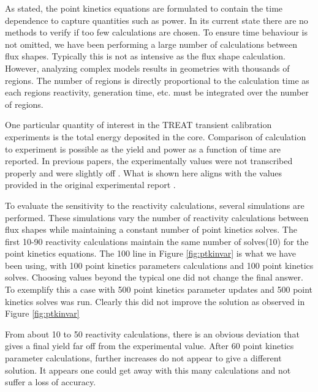 \documentclass{anstrans}
\begin{document}
As stated, the point kinetics equations are formulated to contain the time dependence to capture quantities such as power.  In its current state there are no methods to verify if too few calculations are chosen. To ensure time  behaviour is not omitted, we have been performing a large number of calculations between flux shapes.  Typically this is not as intensive as the flux shape calculation.  However, analyzing complex models results in geometries with thousands of regions. The number of regions is directly proportional to the calculation time as each regions reactivity, generation time, etc. must be integrated over the number of regions.  

One particular quantity of interest in the TREAT transient calibration experiments is the total energy deposited in the core.  Comparison of calculation to experiment is possible as the yield and power as a function of time are reported.  In previous  papers, the experimentally values were not transcribed properly and were slightly off \cite{physor_mausolff , physor_paluch}.  What is shown here aligns with the values provided in the original experimental report \cite{Robinson_Bauer_1994}. 
   
   To evaluate the sensitivity to the reactivity calculations, several simulations are performed.  These simulations vary the number of reactivity calculations between flux shapes while maintaining a constant number of point kinetics solves.  The first 10-90 reactivity calculations maintain the same number of solves(10) for the point kinetics equations.  The 100 line in Figure \ref{fig:ptkinvar} is what we have been using, with 100 point kinetics parameters calculations and 100 point kinetics solves. Choosing values beyond the typical one did not change the final answer.  To exemplify this a case with  500 point kinetics parameter updates and 500 point kinetics solves was run. Clearly this did not improve the solution as observed in Figure \ref{fig:ptkinvar}
   
   From about 10 to 50 reactivity calculations, there is an obvious deviation that gives a final yield far off from the experimental value.  After 60 point kinetics parameter calculations, further increases do not appear to give a different solution.  It appears one could get away with this many calculations and not suffer a loss of accuracy.
\end{document}
